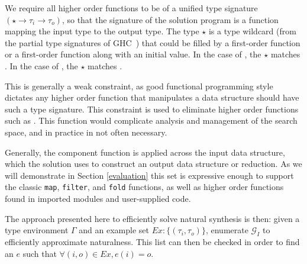 We require all higher order functions to be of a unified type signature $(\star \to \tau_i \to \tau_o)$, so that the signature of the solution program is a function mapping the input type to the output type. 
The type $\star$ is a type wildcard (from the partial type signatures of GHC~\cite{ghc}) that could be filled by a first-order function or a first-order function along with an initial value.
In the case of , the $\star$ matches .
In the case of , the $\star$ matches .

This is generally a weak constraint, as good functional programming style dictates any higher order function that manipulates a data structure should have such a type signature.
This constraint is used to eliminate higher order functions such as .
This function would complicate analysis and management of the search space, and in practice in not often necessary.




Generally, the component function is applied across the \textsf{input} data structure, which the \textsf{solution} uses to construct an \textsf{output} data structure or reduction.
As we will demonstrate in Section \ref{evaluation} this set is expressive enough to support the classic \texttt{map}, \texttt{filter}, and \texttt{fold} functions, as well as higher order functions found in imported modules and user-supplied code.

The approach presented here to efficiently solve natural synthesis is then: given a type environment $\Gamma$ and an example set $Ex:\{(\tau_i,\tau_o)\}$, enumerate $\mathcal{G}_I$ to efficiently approximate naturalness.
This list can then be checked in order to find an $e$ such that $\forall (i,o) \in Ex, e (i) = o$.
